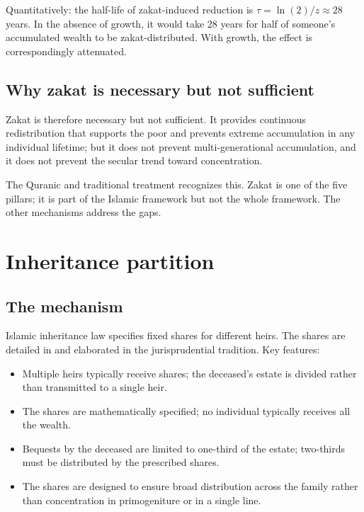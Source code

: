 Quantitatively: the half-life of zakat-induced reduction is
$\tau = \ln(2)/z \approx 28$ years. In the absence of growth, it
would take 28 years for half of someone's accumulated wealth to be
zakat-distributed. With growth, the effect is correspondingly
attenuated.

\subsection{Why zakat is necessary but not sufficient}

Zakat is therefore necessary but not sufficient. It provides
continuous redistribution that supports the poor and prevents
extreme accumulation in any individual lifetime; but it does not
prevent multi-generational accumulation, and it does not prevent
the secular trend toward concentration.

The Quranic and traditional treatment recognizes this. Zakat is
one of the five pillars; it is part of the Islamic framework but
not the whole framework. The other mechanisms address the gaps.

\section{Inheritance partition}
\label{sec:perm-inheritance}

\subsection{The mechanism}

Islamic inheritance law specifies fixed shares for different
heirs. The shares are detailed in  and elaborated
in the jurisprudential tradition. Key features:

\begin{itemize}[leftmargin=2em]
    \item Multiple heirs typically receive shares; the deceased's
    estate is divided rather than transmitted to a single heir.
    \item The shares are mathematically specified; no individual
    typically receives all the wealth.
    \item Bequests by the deceased are limited to one-third of the
    estate; two-thirds must be distributed by the prescribed shares.
    \item The shares are designed to ensure broad distribution
    across the family rather than concentration in primogeniture
    or in a single line.
\end{itemize}

